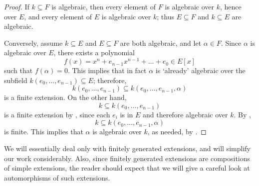 \begin{proof}
  If $k \subseteq F$ is algebraic, then every element of $F$ is
  algebraic over $k$, hence over $E$, and every element of $E$ is
  algebraic over $k$; thus $E \subseteq F$ and $k \subseteq E$ are
  algebraic.

  Conversely, assume $k \subseteq E$ and $E \subseteq F$ are both
  algebraic, and let $\alpha \in F$. Since $\alpha$ is algebraic over
  $E$, there exists a polynomial
  \[
    f(x) = x^n + e_{n-1}x^{n-1} + \dots + e_0 \in E[x]
  \]
  such that $f(\alpha) = 0$. This implies that in fact $\alpha$ is
  `already' algebraic over the subfield
  $k(e_0, \dots, e_{n-1}) \subseteq E$; therefore,
  \[
    k(e_0, \dots, e_{n-1}) \subseteq k(e_0, \dots, e_{n-1}, \alpha)
  \]
  is a finite extension. On the other hand,
  \[
    k \subseteq k(e_0, \dots, e_{n-1})
  \]
  is a finite extension by , since each $e_i$
  is in $E$ and therefore algebraic over $k$. By
  ,
  \[
    k \subseteq k(e_0, \dots, e_{n-1}, \alpha)
  \]
  is finite. This implies that $\alpha$ is algebraic over $k$, as
  needed, by .
\end{proof}
We will essentially deal only with finitely generated extensions, and
 will simplify our work considerably. Also,
since finitely generated extensions are compositions of simple
extensions, the reader should expect that we will give a careful look
at automorphisms of such extensions.

